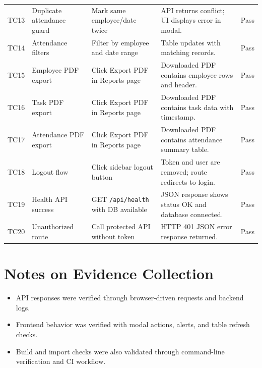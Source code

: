 \begin{longtable}{T{0.9cm}T{2.4cm}T{3.0cm}T{5.0cm}T{1.7cm}}
TC13 & Duplicate attendance guard & Mark same employee/date twice & API returns conflict; UI displays error in modal. & Pass \\
TC14 & Attendance filters & Filter by employee and date range & Table updates with matching records. & Pass \\
TC15 & Employee PDF export & Click Export PDF in Reports page & Downloaded PDF contains employee rows and header. & Pass \\
TC16 & Task PDF export & Click Export PDF in Reports page & Downloaded PDF contains task data with timestamp. & Pass \\
TC17 & Attendance PDF export & Click Export PDF in Reports page & Downloaded PDF contains attendance summary table. & Pass \\
TC18 & Logout flow & Click sidebar logout button & Token and user are removed; route redirects to login. & Pass \\
TC19 & Health API success & GET \texttt{/api/health} with DB available & JSON response shows status OK and database connected. & Pass \\
TC20 & Unauthorized route & Call protected API without token & HTTP 401 JSON error response returned. & Pass \\
\bottomrule
\end{longtable}
\normalsize

\section*{Notes on Evidence Collection}
\begin{itemize}[leftmargin=1.3cm]
\item API responses were verified through browser-driven requests and backend logs.
\item Frontend behavior was verified with modal actions, alerts, and table refresh checks.
\item Build and import checks were also validated through command-line verification and CI workflow.
\end{itemize}
